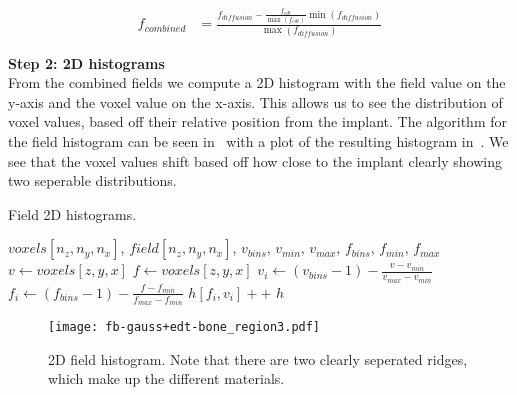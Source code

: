 \begin{equation}
    \label{eq:field-comb}
    \begin{split}
        f_{combined} &= \frac{f_{diffusion} - \frac{f_{edt}}{\max (f_{edt})} \min (f_{diffusion})}{\max (f_{diffusion})}
    \end{split}
\end{equation}

\vspace{\baselineskip}
\noindent\textbf{Step 2: 2D histograms} \\

From the combined fields we compute a 2D histogram with the field value on the y-axis and the voxel value on the x-axis. 
This allows us to see the distribution of voxel values, based off their relative position from the implant.
The algorithm for the field histogram can be seen in~ with a plot of the resulting histogram in~.
We see that the voxel values shift based off how close to the implant clearly showing two seperable distributions.

\begin{algorithm}
    \caption{Field 2D histograms.}
    \label{alg:field-hist}
    \begin{algorithmic}
         {$voxels[n_z,n_y,n_x]$, $field[n_z,n_y,n_x]$, $v_{bins}$, \indent \indent $v_{min}$, $v_{max}$, $f_{bins}$, $f_{min}$, $f_{max}$}
                \State $v \gets voxels[z,y,x]$
                    \State $f \gets voxels[z,y,x]$
                        \State $v_i \gets (v_{bins} - 1) - \frac{v - v_{min}}{v_{max} - v_{min}}$
                        \State $f_i \gets (f_{bins} - 1) - \frac{f - f_{min}}{f_{max} - f_{min}}$
                        \State $h[f_i,v_i]{+}{+}$
                    \EndIf
                \EndIf
            \EndFor
            \Return $h$
        \EndFunction
    \end{algorithmic}
\end{algorithm}

\begin{figure}
    \texttt{[image: fb-gauss+edt-bone\_region3.pdf]}
    \caption{2D field histogram. Note that there are two clearly seperated ridges, which make up the different materials.}
    \label{fig:field-hist}
\end{figure}

